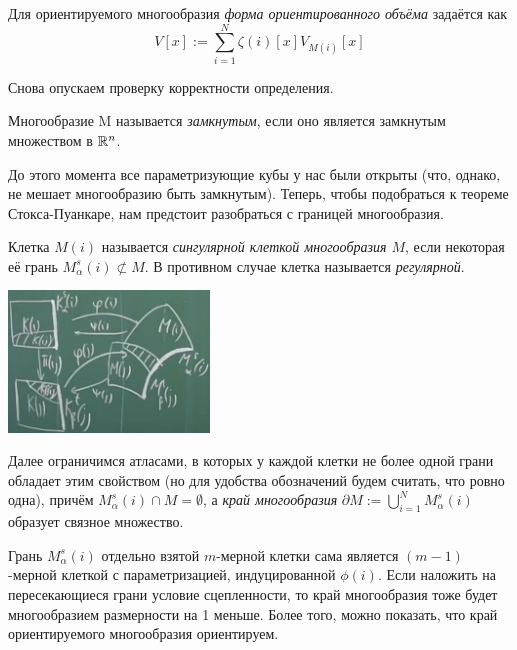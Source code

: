 \begin{definition}
	Для ориентируемого многообразия \textit{форма ориентированного объёма} задаётся как
	\[
		V[x] := \sum_{i=1}^N \zeta(i)[x] V_{M(i)}[x]
	\]
\end{definition}

\begin{note}
	Снова опускаем проверку корректности определения.
\end{note}

\begin{definition}
	Многообразие M называется \textit{замкнутым}, если оно является замкнутым множеством в $\mathbb{R}^n$.
\end{definition}

До этого момента все параметризующие кубы у нас были открыты (что, однако, не мешает многообразию быть замкнутым). Теперь, чтобы подобраться к теореме Стокса-Пуанкаре, нам предстоит разобраться с границей многообразия.

\begin{definition}
	Клетка $M(i)$ называется \textit{сингулярной клеткой многообразия $M$}, если некоторая её грань $M_\alpha^s(i) \not\subset M$. В противном случае клетка называется \textit{регулярной}.
\end{definition}

\begin{center}
	\includegraphics[width=0.4\textwidth]{images/manifold_border.png}
\end{center}

\begin{note}
	Далее ограничимся атласами, в которых у каждой клетки не более одной грани обладает этим свойством (но для удобства обозначений будем считать, что ровно одна), причём $M_\alpha^s(i) \cap M = \emptyset$, а \textit{край многообразия} $\partial M := \bigcup_{i=1}^N M_\alpha^s(i)$ образует связное множество.
\end{note}

\begin{note}
	Грань $M_\alpha^s(i)$ отдельно взятой $m$-мерной клетки сама является $(m-1)$-мерной клеткой с параметризацией, индуцированной $\phi(i)$. Если наложить на пересекающиеся грани условие сцепленности, то край многообразия тоже будет многообразием размерности на 1 меньше. Более того, можно показать, что край ориентируемого многообразия ориентируем.
\end{note}

